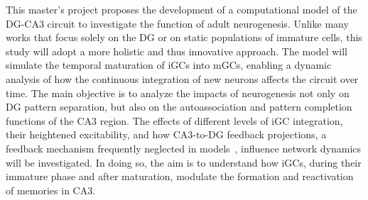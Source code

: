 This master's project proposes the development of a computational model of the DG-CA3 circuit to investigate the function of
adult neurogenesis. Unlike many works that focus solely on the DG or on static populations of immature cells, this study will
adopt a more holistic and thus innovative approach. The model will simulate the temporal maturation of iGCs into mGCs, enabling
a dynamic analysis of how the continuous integration of new neurons affects the circuit over time. The main objective is to
analyze the impacts of neurogenesis not only on DG pattern separation, but also on the autoassociation and pattern completion
functions of the CA3 region. The effects of different levels of iGC integration, their heightened excitability, and how
CA3-to-DG feedback projections, a feedback mechanism frequently neglected in models~\parencite{myersPattern2011}, influence network
dynamics will be investigated. In doing so, the aim is to understand how iGCs, during their immature phase and after maturation,
modulate the formation and reactivation of memories in CA3.






